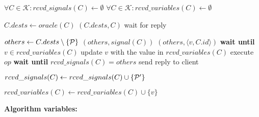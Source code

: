 \begin{algorithm}[t!]
\small

\begin{distribalgo}[1]

\vspace{1mm}

    \STATE $\forall C \in \mathcal{K} : rcvd\_signals(C) \leftarrow \emptyset$
    \STATE $\forall C \in \mathcal{K} : rcvd\_variables(C) \leftarrow \emptyset$
\ENDINDENT

\vspace{1.25mm}
    \STATE $C.dests \leftarrow oracle(C)$ \label{algline:oracle} 
	\STATE \amcast$(C.dests, C)$ \label{algline:climcast}
	\STATE wait for reply
\ENDINDENT

\vspace{1.25mm}
	    \STATE $others \leftarrow C.dests \setminus \{\mathcal{P}{}\}$
	    \STATE \rmcast$(others, signal(C))$ \label{algline:mcastsignals}
			        \STATE \rmcast$(others, \langle v, C.id \rangle)$ \label{algline:multicastv}
			    \ELSE
			        \STATE \textbf{wait until} $v \in rcvd\_variables(C)$ \label{algline:waitvariable}
			        \STATE update $v$ with the value in $rcvd\_variables(C)$
			    \ENDIF
			\ENDIF
			\STATE execute $op$ \label{algline:executeopck}
		\ENDFOR
		\STATE \textbf{wait until} $rcvd\_signals(C) = others$ \label{algline:waitsignals}
		\STATE send reply to client \label{algline:sendreply}
	\ENDINDENT
	
	\vspace{1.25mm}
	    \STATE $rcvd\_signals(C) \leftarrow rcvd\_signals(C) \cup \{\mathcal{P}'\}$
	\ENDINDENT

	\vspace{1.25mm}
	    \STATE $rcvd\_variables(C) \leftarrow rcvd\_variables(C) \cup \{v\}$
	\ENDINDENT
			
\ENDINDENT

\vspace{1.7mm}

\textbf{Algorithm variables:}

\vspace{1.25mm}


\end{distribalgo}
\end{algorithm}
